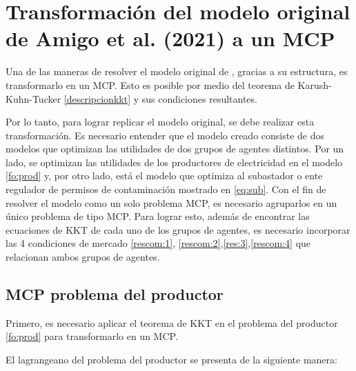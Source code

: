 \section{Transformación del modelo original de Amigo et al. (2021) a un MCP}

Una de las maneras de resolver el modelo original de , gracias a su estructura, es transformarlo en un MCP. Esto es posible por medio del teorema de Karush-Kuhn-Tucker \ref{descripcionkkt} y sus condiciones resultantes. 
\vspace{2.5mm}

Por lo tanto, para lograr replicar el modelo original,  se debe realizar esta transformación. Es necesario entender que el modelo creado consiste de dos modelos que optimizan las utilidades de dos grupos de agentes distintos. Por un lado, se optimizan las utilidades de los productores de electricidad en el modelo \ref{fo:prod} y, por otro lado, está el modelo que optimiza al subastador o ente regulador de permisos de contaminación mostrado en \ref{eq:sub}. Con el fin de resolver el modelo como un solo problema MCP, es necesario agruparlos en un único problema de tipo MCP. Para lograr esto, además de encontrar las ecuaciones de KKT de cada uno de los grupos de agentes, es necesario incorporar las 4 condiciones de mercado \ref{rescom:1}, \ref{rescom:2},\ref{res:3},\ref{rescom:4} que relacionan ambos grupos de agentes.

\subsection{MCP problema del productor}\label{MCPproductor}

Primero, es necesario aplicar el teorema de KKT en el problema del productor \ref{fo:prod} para transformarlo en un MCP.
\vspace{2.5mm}

El lagrangeano del problema del productor se presenta de la siguiente manera: 

